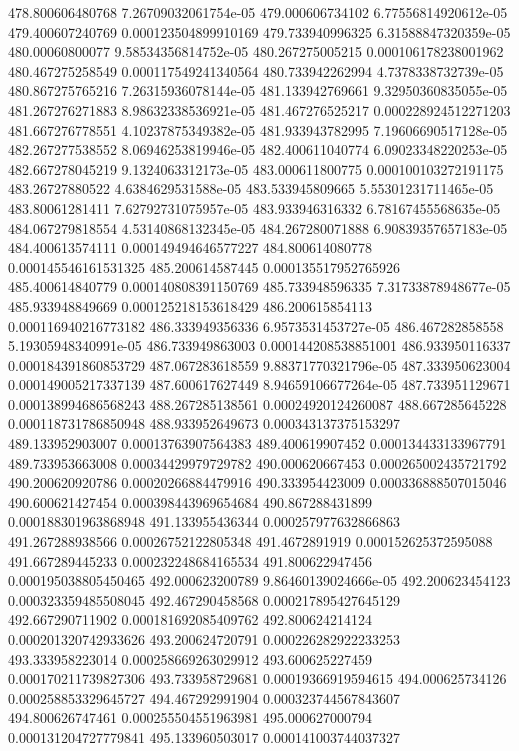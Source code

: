 {478.800606480768 7.26709032061754e-05
479.000606734102 6.77556814920612e-05
479.400607240769 0.000123504899910169
479.733940996325 6.31588847320359e-05
480.00060800077 9.58534356814752e-05
480.267275005215 0.000106178238001962
480.467275258549 0.000117549241340564
480.733942262994 4.7378338732739e-05
480.867275765216 7.26315936078144e-05
481.133942769661 9.32950360835055e-05
481.267276271883 8.98632338536921e-05
481.467276525217 0.000228924512271203
481.667276778551 4.10237875349382e-05
481.933943782995 7.19606690517128e-05
482.267277538552 8.06946253819946e-05
482.400611040774 6.09023348220253e-05
482.667278045219 9.1324063312173e-05
483.000611800775 0.000100103272191175
483.26727880522 4.6384629531588e-05
483.533945809665 5.55301231711465e-05
483.80061281411 7.62792731075957e-05
483.933946316332 6.78167455568635e-05
484.067279818554 4.53140868132345e-05
484.267280071888 6.90839357657183e-05
484.400613574111 0.000149494646577227
484.800614080778 0.000145546161531325
485.200614587445 0.000135517952765926
485.400614840779 0.000140808391150769
485.733948596335 7.31733878948677e-05
485.933948849669 0.000125218153618429
486.200615854113 0.000116940216773182
486.333949356336 6.9573531453727e-05
486.467282858558 5.19305948340991e-05
486.733949863003 0.000144208538851001
486.933950116337 0.000184391860853729
487.067283618559 9.88371770321796e-05
487.333950623004 0.000149005217337139
487.600617627449 8.94659106677264e-05
487.733951129671 0.000138994686568243
488.267285138561 0.00024920124260087
488.667285645228 0.000118731786850948
488.933952649673 0.000343137375153297
489.133952903007 0.00013763907564383
489.400619907452 0.000134433133967791
489.733953663008 0.00034429979729782
490.000620667453 0.000265002435721792
490.200620920786 0.00020266884479916
490.333954423009 0.000336888507015046
490.600621427454 0.000398443969654684
490.867288431899 0.000188301963868948
491.133955436344 0.000257977632866863
491.267288938566 0.00026752122805348
491.4672891919 0.000152625372595088
491.667289445233 0.000232248684165534
491.800622947456 0.000195038805450465
492.000623200789 9.86460139024666e-05
492.200623454123 0.000323359485508045
492.467290458568 0.000217895427645129
492.667290711902 0.000181692085409762
492.800624214124 0.000201320742933626
493.200624720791 0.000226282922233253
493.333958223014 0.000258669263029912
493.600625227459 0.000170211739827306
493.733958729681 0.00019366919594615
494.000625734126 0.000258853329645727
494.467292991904 0.000323744567843607
494.800626747461 0.000255504551963981
495.000627000794 0.000131204727779841
495.133960503017 0.000141003744037327
}
